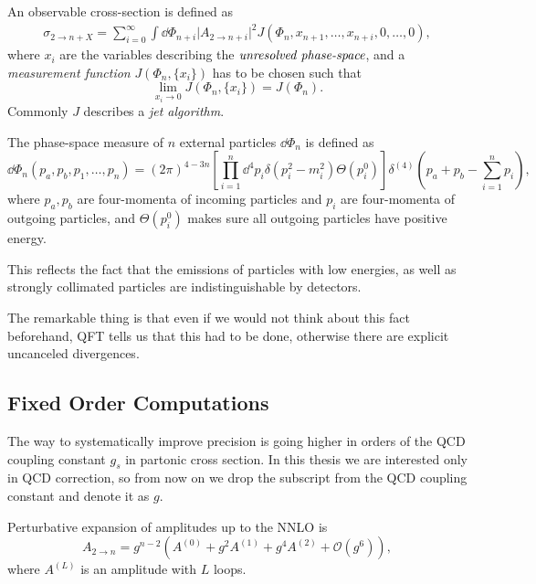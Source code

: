 An observable cross-section is defined as
\begin{multline}
  \sigma_{2\rightarrow n + X} = %
  \sum_{i=0}^{\infty} \int \dd\Phi_{n+i} \vert A_{2\rightarrow n+i} \vert^2 J(\Phi_{n},x_{n+1},\ldots,x_{n+i},0,\ldots,0),
  \label{eq:IRsafeXS}
\end{multline}
where $x_i$ are the variables describing the $\emph{unresolved phase-space}$, and
a \emph{measurement function} $J(\Phi_n, \{x_i\})$ has to be chosen such that
\begin{equation}
  \lim_{x_i\to 0}J(\Phi_n, \{x_i\}) = J(\Phi_n).
  \label{eq:IRsafeConditions}
\end{equation}
Commonly $J$ describes a \emph{jet algorithm}.

The phase-space measure of $n$ external particles $\dd\Phi_n$ is defined as
\begin{equation}
  \dd\Phi_n(p_a,p_b,p_1,\ldots,p_n) = (2\pi)^{4-3n} \left[ \prod_{i=1}^{n}\dd^4 p_i \delta(p_i^2-m_i^2) \Theta(p_i^{0}) \right] \delta^{(4)}\left(p_a+p_b - \sum_{i=1}^{n}p_i\right),
  \label{eq:PS}
\end{equation}
where $p_a,p_b$ are four-momenta of incoming particles and $p_i$ are four-momenta of outgoing particles, and
$\Theta(p_i^{0})$ makes sure all outgoing particles have positive energy.


This reflects the fact that the emissions of particles with low energies, as well
as strongly collimated particles are indistinguishable by detectors.

The remarkable thing is that even if we would not think about this fact beforehand, QFT tells us that
this had to be done, otherwise there are explicit uncanceled divergences.


\subsection{Fixed Order Computations}


The way to systematically improve precision is going higher in orders of the QCD coupling constant $g_s$
in partonic cross section. In this thesis we are interested only in QCD correction, so from now on
we drop the subscript from the QCD coupling constant and denote it as $g$.

Perturbative expansion of amplitudes up to the NNLO is
\begin{equation}
  \label{eq:amplitudes_expansion}
  A_{2\to n} = g^{n-2} \left( A^{(0)} + g^2 A^{(1)} + g^4 A^{(2)} + \mathcal{O}(g^{6}) \right),
\end{equation}
where $A^{(L)}$ is an amplitude with $L$ loops.

